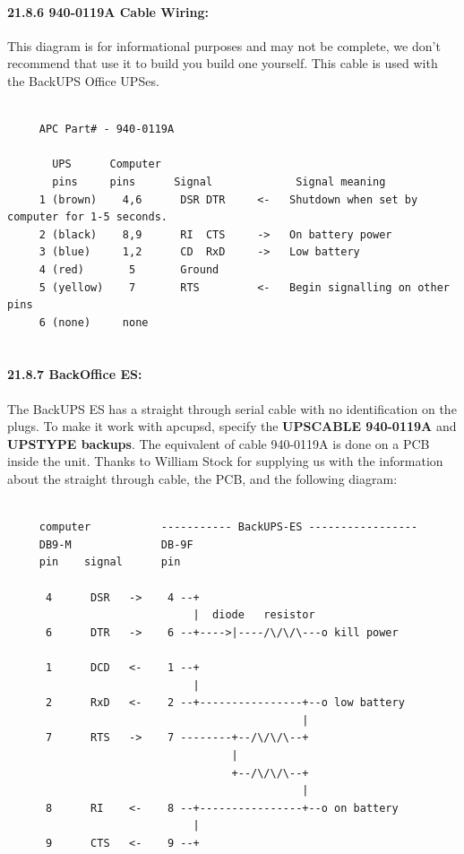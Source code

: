 {{{{{{{{{{\label{940_002d0119A-Cable-Wiring}

\paragraph*{21.8.6 940-0119A Cable Wiring:}

\label{index-Cables-208}
This diagram is for informational purposes and may not be complete, we don't
recommend that use it to build you build one yourself. This cable is used with
the BackUPS Office UPSes. 

\footnotesize
\begin{verbatim}
     
     APC Part# - 940-0119A
     
       UPS      Computer
       pins     pins      Signal             Signal meaning
     1 (brown)    4,6      DSR DTR     <-   Shutdown when set by computer for 1-5 seconds.
     2 (black)    8,9      RI  CTS     ->   On battery power
     3 (blue)     1,2      CD  RxD     ->   Low battery
     4 (red)       5       Ground
     5 (yellow)    7       RTS         <-   Begin signalling on other pins
     6 (none)     none
     
\end{verbatim}
\normalsize

\label{BackOffice-ES}

\paragraph*{21.8.7 BackOffice ES:}

\label{index-Cables-209}
\label{index-BackOffice-ES-210}
The BackUPS ES has a straight through serial cable with no identification on
the plugs. To make it work with apcupsd, specify the {\bf UPSCABLE 940-0119A}
and {\bf UPSTYPE backups}.  The equivalent of cable 940-0119A is done on a PCB
inside the unit.  Thanks to William Stock for supplying us with the
information about the straight through cable, the PCB, and the following
diagram: 

\footnotesize
\begin{verbatim}
     
     computer           ----------- BackUPS-ES -----------------
     DB9-M              DB-9F
     pin    signal      pin
     
      4      DSR   ->    4 --+
                             |  diode   resistor
      6      DTR   ->    6 --+---->|----/\/\/\---o kill power
     
      1      DCD   <-    1 --+
                             |
      2      RxD   <-    2 --+----------------+--o low battery
                                              |
      7      RTS   ->    7 --------+--/\/\/\--+
                                   |
                                   +--/\/\/\--+
                                              |
      8      RI    <-    8 --+----------------+--o on battery
                             |
      9      CTS   <-    9 --+
     

\end{verbatim}}}}}}}}}}}
